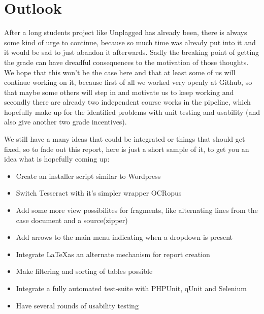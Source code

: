 \section{Outlook}

After a long students project like Unplagged has already been, there is always some kind of urge to continue, because so much time was already put into it and it would be sad to just abandon it afterwards. Sadly the breaking point of getting the grade can have dreadful consequences to the motivation of those thoughts. We hope that this won't be the case here and that at least some of us will continue working on it, because first of all we worked very openly at Github, so that maybe some others will step in and motivate us to keep working and secondly there are already two independent course works in the pipeline, which hopefully make up for the identified problems with unit testing and usability (and also give another two grade incentives).

We still have a many ideas that could be integrated or things that should get fixed, so to fade out this report, here is just a short sample of it, to get you an idea what is hopefully coming up:

\begin{itemize}
\item Create an installer script similar to Wordpress
\item Switch Tesseract with it's simpler wrapper OCRopus
\item Add some more view possibilites for fragments, like alternating lines from the case document and a source(zipper)
\item Add arrows to the main menu indicating when a dropdown is present
\item Integrate \LaTeX as an alternate mechanism for report creation
\item Make filtering and sorting of tables possible
\item Integrate a fully automated test-suite with PHPUnit, qUnit and Selenium
\item Have several rounds of usability testing
\end{itemize}